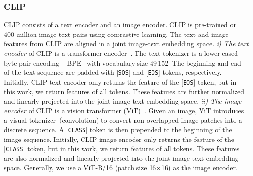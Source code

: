 \documentclass[lettersize,journal]{IEEEtran}
\begin{document}
\subsubsection{CLIP}
CLIP consists of a text encoder and an image encoder.
CLIP is pre-trained on 400 million image-text pairs using contrastive learning.
The text and image features from CLIP are aligned in a joint image-text embedding space.
\textit{i) The text encoder} of CLIP is a transformer encoder~\cite{2017_attention,2019_bert}.
The text tokenizer is a lower-cased byte pair encoding -- BPE~\cite{2016_bpe} with vocabulary size 49\,152.
The beginning and end of the text sequence are padded 
with [\texttt{SOS}] and [\texttt{EOS}] tokens, respectively.
Initially, 
CLIP text encoder only returns the feature of the [\texttt{EOS}] token,
but in this work, we return features of all tokens.
These features are further normalized and linearly projected into the joint image-text embedding space.
\textit{ii) The image encoder} of CLIP is a vision transformer (ViT)~\cite{2021_vit}.
Given an image, ViT introduces a visual tokenizer~(convolution) to convert non-overlapped image patches into a discrete sequence.
A [\texttt{CLASS}] token is then prepended to the beginning of the image sequence.
Initially, 
CLIP image encoder only returns the feature of the [\texttt{CLASS}] token,
but in this work, we return features of all tokens.
These features are also normalized
and linearly projected into the joint image-text embedding space. Generally, we use a ViT-B/16 (patch size 16$\times$16) as the image encoder.
\end{document}
